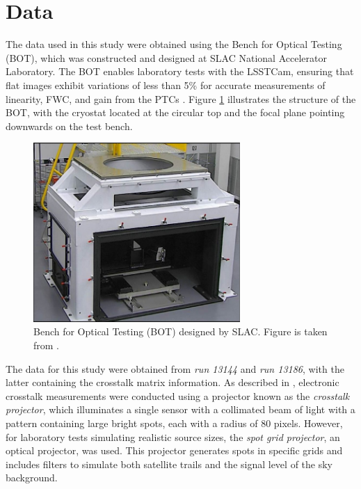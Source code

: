 \section{Data} \label{sec:data}
The data used in this study were obtained using the Bench for Optical Testing (BOT), which was constructed and designed at SLAC National Accelerator Laboratory. The BOT enables laboratory tests with the LSSTCam, ensuring that flat images exhibit variations of less than 5\% for accurate measurements of linearity, FWC, and gain from the PTCs \citep{2018SPIE10702E..58N}. Figure \ref{fig:BOT_stand} illustrates the structure of the BOT, with the cryostat located at the circular top and the focal plane pointing downwards on the test bench.

\begin{figure}[!htb]
    \centering
    \includegraphics[width=0.7\textwidth]{Figures/BOT_stand.png}
    \caption{Bench for Optical Testing (BOT) designed by SLAC. Figure is taken from \cite{2018SPIE10702E..58N}. }
    \label{fig:BOT_stand}
\end{figure}

The data for this study were obtained from \textit{run 13144} and \textit{run 13186}, with the latter containing the crosstalk matrix information. As described in \cite{2020SPIE11454E..39S}, electronic crosstalk measurements were conducted using a projector known as the \textit{crosstalk projector}, which illuminates a single sensor with a collimated beam of light with a pattern containing large bright spots, each with a radius of 80 pixels. However, for laboratory tests simulating realistic source sizes, the \textit{spot grid projector}, an optical projector, was used. This projector generates spots in specific grids and includes filters to simulate both satellite trails and the signal level of the sky background.